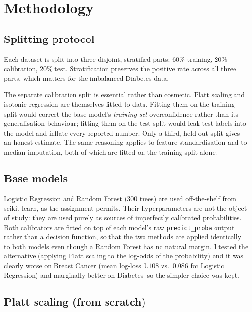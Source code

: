 \documentclass[11pt,a4paper]{article}
\begin{document}
\section{Methodology}

\subsection{Splitting protocol}

Each dataset is split into three disjoint, stratified parts: $60\%$ training, $20\%$ calibration, $20\%$
test. Stratification preserves the positive rate across all three parts, which matters for the imbalanced
Diabetes data.

The separate calibration split is essential rather than cosmetic. Platt scaling and isotonic regression
are themselves fitted to data. Fitting them on the training split would correct the base model's
\emph{training-set} overconfidence rather than its generalisation behaviour; fitting them on the test
split would leak test labels into the model and inflate every reported number. Only a third, held-out
split gives an honest estimate. The same reasoning applies to feature standardisation and to median
imputation, both of which are fitted on the training split alone.

\subsection{Base models}

Logistic Regression and Random Forest ($300$ trees) are used off-the-shelf from scikit-learn, as the
assignment permits. Their hyperparameters are not the object of study: they are used purely as sources of
imperfectly calibrated probabilities. Both calibrators are fitted on top of each model's raw
\texttt{predict\_proba} output rather than a decision function, so that the two methods are applied
identically to both models even though a Random Forest has no natural margin. I tested the alternative
(applying Platt scaling to the log-odds of the probability) and it was clearly worse on Breast Cancer
(mean log-loss $0.108$ vs.\ $0.086$ for Logistic Regression) and marginally better on Diabetes, so the
simpler choice was kept.

\subsection{Platt scaling (from scratch)}
\end{document}
